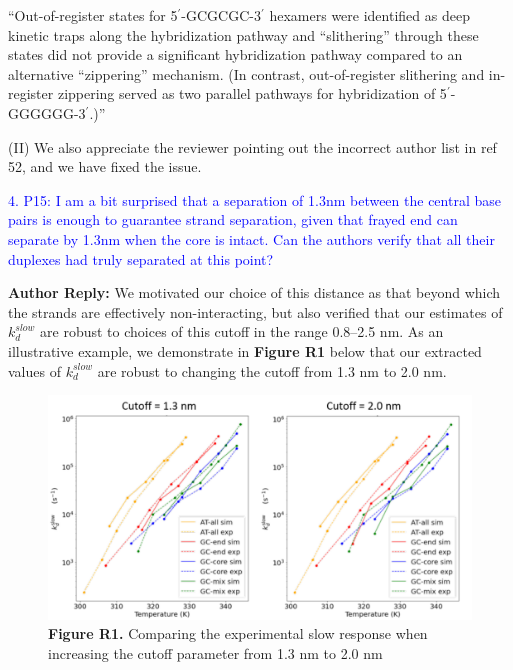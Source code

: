 \documentclass[11pt,a4paper]{letter} %
\begin{document}
``Out-of-register states for 5$^\prime$-GCGCGC-3$^\prime$ hexamers were identified as deep kinetic traps along the hybridization pathway and ``slithering'' through these states did not provide a significant hybridization pathway compared to an alternative ``zippering'' mechanism. (In contrast, out-of-register slithering and in-register zippering served as two parallel pathways for hybridization of 5$^\prime$-GGGGGG-3$^\prime$.)'' 

(II) We also appreciate the reviewer pointing out the incorrect author list in ref 52, and we have fixed the issue.





\textcolor{blue}{4. P15: I am a bit surprised that a separation of 1.3nm between the central base pairs is enough to guarantee strand separation, given that frayed end can separate by 1.3nm when the core is intact. Can the authors verify that all their duplexes had truly separated at this point?}

\textbf{Author Reply:}   We motivated our choice of this distance as that beyond which the strands are effectively non-interacting, but also verified that our estimates of $k_d^{slow}$ are robust to choices of this cutoff in the range 0.8--2.5 nm. As an illustrative example, we demonstrate in \textbf{Figure R1} below that our extracted values of $k_d^{slow}$ are robust to changing the cutoff from 1.3 nm to 2.0 nm.  


\begin{figure}[ht!]
	\begin{center}
        \includegraphics[width=\textwidth]{../FigR1.pdf}
        \caption*{\textbf{Figure R1.} Comparing the experimental slow response when increasing the cutoff parameter from 1.3 nm to 2.0 nm}
        \label{fig:compare_cutoffs}
	\end{center}
\end{figure}
\end{document}
